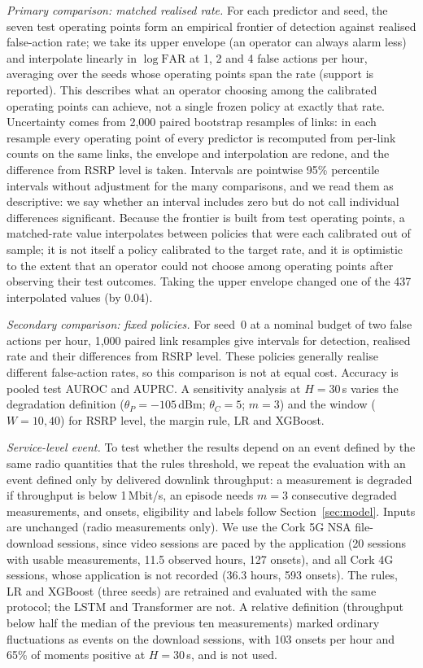 \documentclass[preprint,review,12pt]{elsarticle}
\newcommand{\FAR}{\mathrm{FAR}}
\begin{document}
\emph{Primary comparison: matched realised rate.} For each predictor and seed, the
seven test operating points form an empirical frontier of detection against
realised false-action rate; we take its upper envelope (an operator can always
alarm less) and interpolate linearly in $\log\FAR$ at 1, 2 and 4 false actions per
hour, averaging over the seeds whose operating points span the rate (support is
reported). This describes what an operator choosing among the calibrated operating
points can achieve, not a single frozen policy at exactly that rate. Uncertainty
comes from 2{,}000 paired bootstrap resamples of links: in each resample every
operating point of every predictor is recomputed from per-link counts on the same
links, the envelope and interpolation are redone, and the difference from RSRP level
is taken. Intervals are pointwise 95\% percentile intervals without adjustment for
the many comparisons, and we read them as descriptive: we say whether an interval
includes zero but do not call individual differences significant. Because the frontier
is built from test operating points, a matched-rate value interpolates between policies
that were each calibrated out of sample; it is not itself a policy calibrated to the
target rate, and it is optimistic to the extent that an operator could not choose among
operating points after observing their test outcomes. Taking the upper envelope changed
one of the 437 interpolated values (by 0.04).

\emph{Secondary comparison: fixed policies.} For seed~0 at a nominal budget of two
false actions per hour, 1{,}000 paired link resamples give intervals for detection,
realised rate and their differences from RSRP level. These policies generally
realise different false-action rates, so this comparison is not at equal cost.
Accuracy is pooled test AUROC and AUPRC. A sensitivity analysis at $H=30$\,s varies
the degradation definition ($\theta_P=-105$\,dBm; $\theta_C=5$; $m=3$) and the window
($W=10,40$) for RSRP level, the margin rule, LR and XGBoost.

\emph{Service-level event.} To test whether the results depend on an event defined by
the same radio quantities that the rules threshold, we repeat the evaluation with an
event defined only by delivered downlink throughput: a measurement is degraded if
throughput is below 1\,Mbit/s, an episode needs $m=3$ consecutive degraded measurements,
and onsets, eligibility and labels follow Section~\ref{sec:model}. Inputs are unchanged
(radio measurements only). We use the Cork 5G NSA file-download sessions, since
video sessions are paced by the application (20 sessions with usable measurements,
11.5 observed hours, 127 onsets), and all Cork 4G sessions, whose application is not
recorded (36.3 hours, 593 onsets). The rules, LR and XGBoost (three seeds) are
retrained and evaluated with the same protocol; the LSTM and Transformer are not. A
relative definition (throughput below half the median of the previous ten
measurements) marked ordinary fluctuations as events on the download sessions, with
103 onsets per hour and 65\% of moments positive at $H=30$\,s, and is not used.
\end{document}
